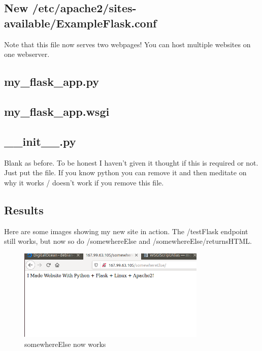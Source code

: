\documentclass[10pt]{article}
\begin{document}
\subsection{New /etc/apache2/sites-available/ExampleFlask.conf}
Note that this file now serves two webpages! You can host multiple websites on one webserver.


\subsection{my\_flask\_app.py}


\subsection{my\_flask\_app.wsgi}


\subsection{\_\_init\_\_.py}
Blank as before. To be honest I haven't given it thought if this is required or not. Just put the file. If you know python you can remove it and then meditate on why it works / doesn't work if you remove this file.

\subsection{ Results }
Here are some images showing my new site in action. The /testFlask endpoint still works, but now so do /somewhereElse and /somewhereElse/returnsHTML.

\begin{figure}[h]
  \centering
    \includegraphics[width=0.8\textwidth]{somewhereElse.png}
  \caption{somewhereElse now works}
\end{figure}
\end{document}
